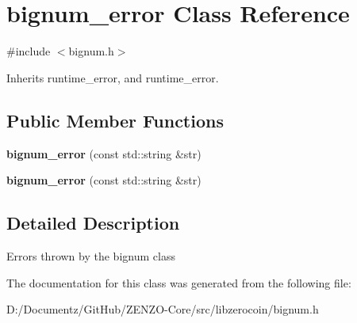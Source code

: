 \hypertarget{classbignum__error}{}\section{bignum\+\_\+error Class Reference}
\label{classbignum__error}


{\ttfamily \#include $<$bignum.\+h$>$}



Inherits runtime\+\_\+error, and runtime\+\_\+error.

\subsection*{Public Member Functions}
\begin{DoxyCompactItemize}
\item 
\mbox{\label{classbignum__error_a500a3bab949914c4d3202cbb9241f10f}} 
{\bfseries bignum\+\_\+error} (const std\+::string \&str)
\item 
\mbox{\label{classbignum__error_a500a3bab949914c4d3202cbb9241f10f}} 
{\bfseries bignum\+\_\+error} (const std\+::string \&str)
\end{DoxyCompactItemize}


\subsection{Detailed Description}
Errors thrown by the bignum class 

The documentation for this class was generated from the following file\+:\begin{DoxyCompactItemize}
\item 
D\+:/\+Documentz/\+Git\+Hub/\+Z\+E\+N\+Z\+O-\/\+Core/src/libzerocoin/bignum.\+h\end{DoxyCompactItemize}
